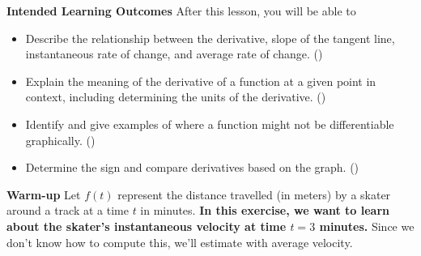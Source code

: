 \documentclass[10pt]{article}
\begin{document}
\pagestyle{otherpages}
\thispagestyle{firstpage}

\textbf{Intended Learning Outcomes}
After this lesson, you will be able to 

\begin{itemize}
    \item Describe the relationship between the derivative, slope of the tangent line, instantaneous rate of change, and average rate of change. ()
    \item Explain the meaning of the derivative of a function at a given point in context, including determining the units of the derivative. ()
    \item Identify and give examples of where a function might not be differentiable graphically. ()
    \item Determine the sign and compare derivatives based on the graph. ()
\end{itemize}

\vspace{-0.5cm}

\hrulefill


{\bf\color{blue}Warm-up}   Let $f(t)$ represent the distance travelled (in meters) by a skater around a track at a time $t$ in minutes. {\bf In this exercise, we want to learn about the skater's instantaneous velocity at time $t=3$ minutes.} Since we don't know how to compute this, we'll estimate with average velocity.\\
\end{document}
